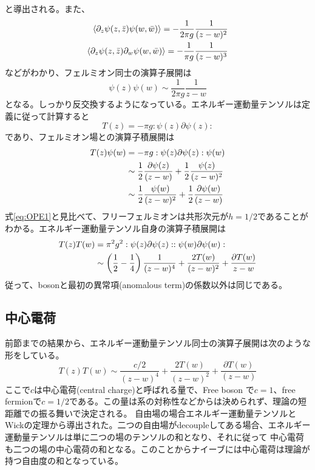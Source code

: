 \documentclass[11pt, aps, longbibliography]{article}
\numberwithin{equation}{section}
\begin{document}
        と導出される。また、
        \begin{align}\label{eq:FreeFermion7}
            \expval{\partial_z \psi(z,\bar{z})\psi(w,\bar{w})} = -\frac{1}{2\pi g}\frac{1}{(z-w)^2} \\
            \expval{\partial_z \psi(z, \bar{z})\partial_w\psi (w, \bar{w})} = -\frac{1}{\pi g}\frac{1}{(z-w)^3}
        \end{align}
        などがわかり、フェルミオン同士の演算子展開は
        \begin{equation}\label{eq:FreeFermion8}
            \psi(z)\psi(w) \sim \frac{1}{2\pi g}\frac{1}{z-w}
        \end{equation}
        となる。しっかり反交換するようになっている。エネルギー運動量テンソルは定義に従って計算すると
        \begin{equation}\label{eq:FreeFermion9}
            T(z) = -\pi g :\psi(z)\partial \psi(z):
        \end{equation}
        であり、フェルミオン場との演算子積展開は
        \begin{align}\label{eq:FreeFermion10}
            T(z)\psi(w) &= -\pi g:\psi(z)\partial \psi(z): \psi(w) \notag \\
            &\sim \frac{1}{2}\frac{\partial \psi(z)}{(z-w)} + \frac{1}{2}\frac{\psi(z)}{(z-w)^2} \notag \\
            &\sim \frac{1}{2}\frac{\psi(w)}{(z-w)^2} + \frac{1}{2}\frac{\partial \psi(w)}{(z-w)}
        \end{align}
        式\eqref{eq:OPE1}と見比べて、フリーフェルミオンは共形次元が$h=1/2$であることがわかる。エネルギー運動量テンソル自身の演算子積展開は
        \begin{align}\label{eq:FreeFermion11}
            T(z)T(w) &= \pi^2 g^2 :\psi(z)\partial\psi(z)::\psi(w)\partial\psi(w): \notag \\
            &\sim \left( \frac{1}{2} - \frac{1}{4} \right) \frac{1}{(z-w)^4} + \frac{2T(w)}{(z-w)^2} + \frac{\partial T(w)}{z-w}
        \end{align}
        従って、bosonと最初の異常項(anomalous term)の係数以外は同じである。

    \subsection{中心電荷}
        前節までの結果から、エネルギー運動量テンソル同士の演算子展開は次のような形をしている。
        \begin{equation}\label{eq:centralcharge1}
            T(z)T(w) \sim \frac{c/2}{(z-w)^4} + \frac{2T(w)}{(z-w)^2} + \frac{\partial T(w)}{(z-w)}
        \end{equation}
        ここで$c$は中心電荷(central charge)と呼ばれる量で、Free boson で$c=1$、free fermionで$c=1/2$である。この量は系の対称性などからは決められず、理論の短距離での振る舞いで決定される。
        自由場の場合エネルギー運動量テンソルとWickの定理から導出された。二つの自由場がdecoupleしてある場合、エネルギー運動量テンソルは単に二つの場のテンソルの和となり、それに従って
        中心電荷も二つの場の中心電荷の和となる。このことからナイーブには中心電荷は理論が持つ自由度の和となっている。
\end{document}

